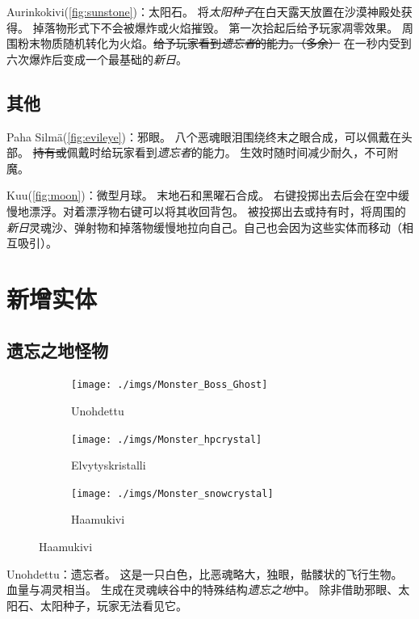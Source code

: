 \documentclass[11pt]{article}
\begin{document}
    Aurinkokivi(\ref{fig:sunstone})：太阳石。
    将\textit{太阳种子}在白天露天放置在沙漠神殿处获得。
    掉落物形式下不会被爆炸或火焰摧毁。
    第一次拾起后给予玩家凋零效果。
    周围粉末物质随机转化为火焰。\sout{给予玩家看到\textit{遗忘者}的能力。（多余）}
    在一秒内受到六次爆炸后变成一个最基础的\textit{新日}。

    \subsection{其他}\label{subsec:others}
    Paha Silmä(\ref{fig:evileye})：邪眼。
    八个恶魂眼泪围绕终末之眼合成，可以佩戴在头部。
    \sout{持有或}佩戴时给玩家看到\textit{遗忘者}的能力。
    生效时随时间减少耐久，不可附魔。

    Kuu(\ref{fig:moon})：微型月球。
    末地石和黑曜石合成。
    右键投掷出去后会在空中缓慢地漂浮。对着漂浮物右键可以将其收回背包。
    被投掷出去或持有时，将周围的\textit{新日}灵魂沙、弹射物和掉落物缓慢地拉向自己。自己也会因为这些实体而移动（相互吸引）。


    \clearpage
    \section{新增实体}\label{sec:new-entities}

    \subsection{遗忘之地怪物}\label{subsec:forgottens}
    \begin{figure}[ht]
        \begin{subfigure}{10em}
            \centering
            \texttt{[image: ./imgs/Monster\_Boss\_Ghost]}
            \caption{Unohdettu}
        \end{subfigure}
        \begin{subfigure}{10em}
            \centering
            \texttt{[image: ./imgs/Monster\_hpcrystal]}
            \caption{Elvytyskristalli}
        \end{subfigure}
        \begin{subfigure}{10em}
            \centering
            \texttt{[image: ./imgs/Monster\_snowcrystal]}
            \caption{Haamukivi}
        \end{subfigure}\label{fig:entities}
    \end{figure}
    Unohdettu：遗忘者。
    这是一只白色，比恶魂略大，独眼，骷髅状的飞行生物。血量与凋灵相当。
    生成在灵魂峡谷中的特殊结构\textit{遗忘之地}中。
    除非借助邪眼、太阳石、太阳种子，玩家无法看见它。
\end{document}
